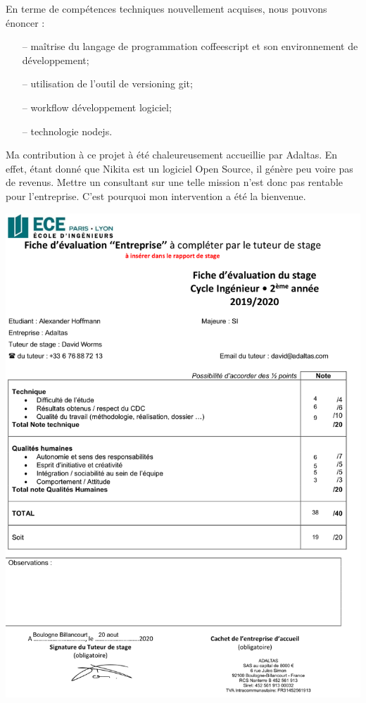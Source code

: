 \documentclass[12pt, french]{report}
\begin{document}
En terme de compétences techniques nouvellement acquises, nous pouvons énoncer :

\begin{itemize}
\item [--] maîtrise du langage de programmation \gls{coffeescript} et son environnement de développement;
\item [--] utilisation de l'outil de versioning \gls{git};
\item [--] workflow développement logiciel;
\item [--] technologie \gls{nodejs}.\\
\end{itemize}

Ma contribution à ce projet à été chaleureusement accueillie par Adaltas. En effet, étant donné que Nikita est un logiciel Open Source, il génère peu voire pas de revenus. Mettre un consultant sur une telle mission n'est donc pas rentable pour l'entreprise. C'est pourquoi mon intervention a été la bienvenue.

\clearpage

\printglossaries

\includegraphics[scale=0.7]{assets/img/eval.png}
\end{document}

